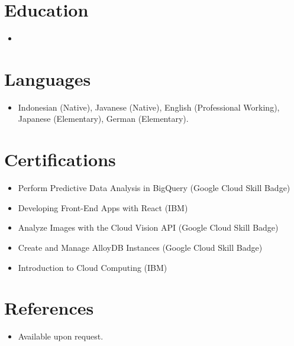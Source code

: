 \documentclass[11pt,a4paper,sans]{moderncv}
\begin{document}

\section{Education}
\vspace{1pt}
\begin{itemize}

\item{}

\end{itemize}


\section{Languages}
\vspace{1pt}
\begin{itemize}
\item {Indonesian (Native), Javanese (Native), English (Professional Working), Japanese (Elementary), German (Elementary).}
\end{itemize}


\section{Certifications}
\vspace{1pt}
\begin{itemize}
\item {Perform Predictive Data Analysis in BigQuery (Google Cloud Skill Badge)}
\item {Developing Front-End Apps with React (IBM)}
\item {Analyze Images with the Cloud Vision API (Google Cloud Skill Badge)}
\item {Create and Manage AlloyDB Instances (Google Cloud Skill Badge)}
\item {Introduction to Cloud Computing (IBM)}
\end{itemize}


\section{References}
\vspace{1pt}
\begin{itemize}
\item{Available upon request.}
\end{itemize}
\end{document}
